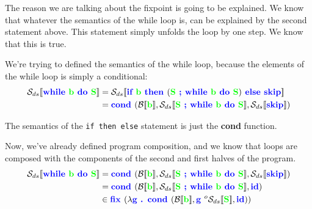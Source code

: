 \documentclass[11pt,a4paper,headsepline,titlepage,dvipsnames,cmyk]{scrartcl}
\begin{document}
The reason we are talking about the fixpoint is going to be explained. We
know that whatever the semantics of the while loop is, can be explained by
the second statement above. This statement simply unfolds the loop by one
step. We know that this is true.

We're trying to defined the semantics of the while loop, because the
elements of the while loop is simply a conditional:
\begin{align*}
    \mathcal{S}_{ds}[\![ {\color{blue}\textbf{while }} {\color{green}
    \textbf{b }} {\color{blue} \textbf{do }} {\color{green} \textbf{S}}
    ]\!]&=\mathcal{S}_{ds}[\![ {\color{blue} \textbf{if }} {\color{green}
    \textbf{b }} {\color{blue} \textbf{then }} ( {\color{green} \textbf{S
}} {\color{blue} \textbf{; while }} {\color{green} \textbf{b }}
{\color{blue} \textbf{do }} {\color{green} \textbf{S}}) {\color{blue}
\textbf{ else skip}} ]\!] \\
&= {\color{blue} \textbf{cond }}( \mathcal{B}[\![ {\color{green}
\textbf{b}} ]\!] , \mathcal{S}_{ds}[\![ {\color{green} \textbf{S }}
{\color{blue} \textbf{; while }} {\color{green} \textbf{b }} {\color{blue}
\textbf{do }} {\color{green} \textbf{S}} ]\!],
\mathcal{S}_{ds}[\![{\color{blue} \textbf{skip}} ]\!])
\end{align*}

The semantics of the \lstinline|if then else| statement is just the
{\color{blue}\textbf{cond}} function.

Now, we've already defined program composition, and we know that loops are
composed with the components of the second and first halves of the
program.
\begin{align*}
\mathcal{S}_{ds}[\![ {\color{blue}\textbf{while }} {\color{green}
    \textbf{b }} {\color{blue} \textbf{do }} {\color{green} \textbf{S}}
    ]\!] &= {\color{blue} \textbf{cond }}( \mathcal{B}[\![ {\color{green}
\textbf{b}} ]\!] , \mathcal{S}_{ds}[\![ {\color{green} \textbf{S }}
{\color{blue} \textbf{; while }} {\color{green} \textbf{b }} {\color{blue}
\textbf{do }} {\color{green} \textbf{S}} ]\!],
\mathcal{S}_{ds}[\![{\color{blue} \textbf{skip}} ]\!]) \\
&= {\color{blue} \textbf{cond }}( \mathcal{B}[\![ {\color{green}
\textbf{b}} ]\!] , \mathcal{S}_{ds}[\![ {\color{green} \textbf{S }}
{\color{blue} \textbf{; while }} {\color{green} \textbf{b }} {\color{blue}
\textbf{do }} {\color{green} \textbf{S}} ]\!],
{\color{blue} \textbf{id}}) \\
&\in {\color{blue} \textbf{fix }} ( \lambda {\color{blue} \textbf{g . cond
}} ( \mathcal{B} [\![ {\color{green} \textbf{b}} ]\!], {\color{blue}
\textbf{g }} ^o \mathcal{S}_{ds}[\![ {\color{green} \textbf{S}} ]\!],
{\color{blue} \textbf{id}}))
\end{align*}
\end{document}
